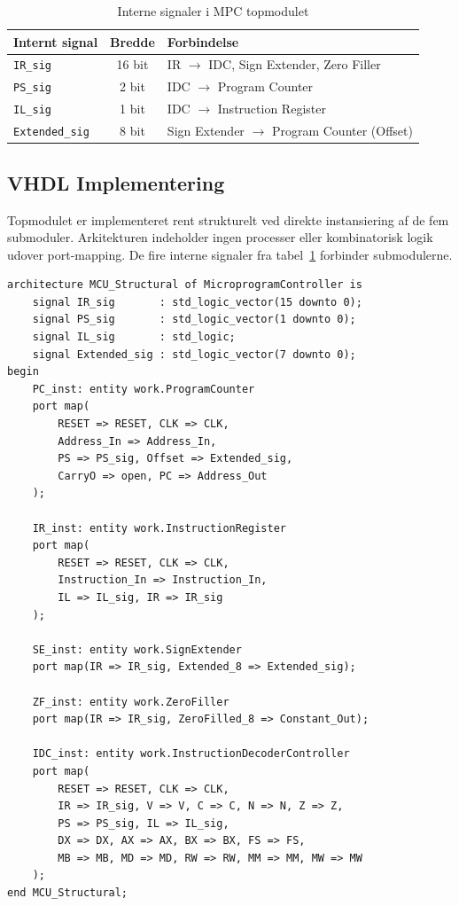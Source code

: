 \documentclass{article}
\begin{document}
\begin{table}[H]
\centering
\begin{tabular}{|l|c|l|}
\hline
\textbf{Internt signal} & \textbf{Bredde} & \textbf{Forbindelse} \\
\hline
\texttt{IR\_sig}       & 16 bit & IR $\rightarrow$ IDC, Sign Extender, Zero Filler \\
\texttt{PS\_sig}       & 2 bit  & IDC $\rightarrow$ Program Counter \\
\texttt{IL\_sig}       & 1 bit  & IDC $\rightarrow$ Instruction Register \\
\texttt{Extended\_sig} & 8 bit  & Sign Extender $\rightarrow$ Program Counter (Offset) \\
\hline
\end{tabular}
\caption{Interne signaler i MPC topmodulet}
\label{tab:mpc-signals}
\end{table}

\subsection{VHDL Implementering}
\label{sec:mpc-vhdl}

Topmodulet er implementeret rent strukturelt ved direkte instansiering af de fem submoduler. Arkitekturen indeholder ingen processer eller kombinatorisk logik udover port-mapping. De fire interne signaler fra tabel~\ref{tab:mpc-signals} forbinder submodulerne.

\begin{lstlisting}[style=vhdl, caption={MPC strukturel arkitektur (uddrag)}, label={lst:mpc-arch}]
architecture MCU_Structural of MicroprogramController is
    signal IR_sig       : std_logic_vector(15 downto 0);
    signal PS_sig       : std_logic_vector(1 downto 0);
    signal IL_sig       : std_logic;
    signal Extended_sig : std_logic_vector(7 downto 0);
begin
    PC_inst: entity work.ProgramCounter
    port map(
        RESET => RESET, CLK => CLK,
        Address_In => Address_In,
        PS => PS_sig, Offset => Extended_sig,
        CarryO => open, PC => Address_Out
    );

    IR_inst: entity work.InstructionRegister
    port map(
        RESET => RESET, CLK => CLK,
        Instruction_In => Instruction_In,
        IL => IL_sig, IR => IR_sig
    );

    SE_inst: entity work.SignExtender
    port map(IR => IR_sig, Extended_8 => Extended_sig);

    ZF_inst: entity work.ZeroFiller
    port map(IR => IR_sig, ZeroFilled_8 => Constant_Out);

    IDC_inst: entity work.InstructionDecoderController
    port map(
        RESET => RESET, CLK => CLK,
        IR => IR_sig, V => V, C => C, N => N, Z => Z,
        PS => PS_sig, IL => IL_sig,
        DX => DX, AX => AX, BX => BX, FS => FS,
        MB => MB, MD => MD, RW => RW, MM => MM, MW => MW
    );
end MCU_Structural;
\end{lstlisting}
\end{document}
